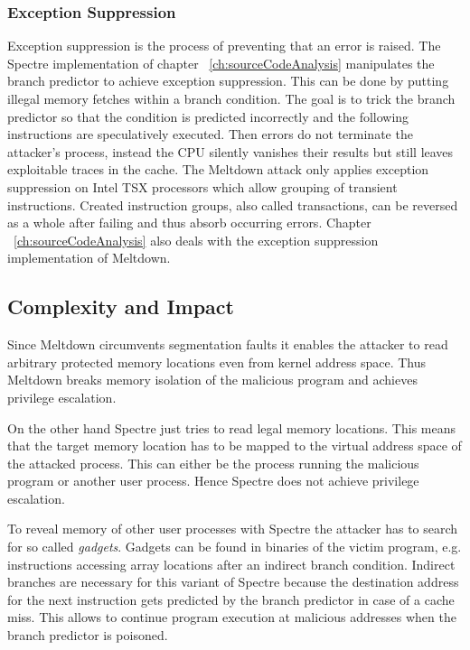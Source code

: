 \documentclass[a4paper,oneside,openright] {scrreprt}
\begin{document}
\subsubsection{Exception Suppression}

Exception suppression is the process of preventing that an error is raised. 
The Spectre implementation of chapter ~\ref{ch:sourceCodeAnalysis} manipulates the branch predictor to achieve exception suppression.
This can be done by putting illegal memory fetches within a branch condition. 
The goal is to trick the branch predictor so that the condition is predicted incorrectly and the following
instructions are speculatively executed.
Then errors do not terminate the attacker's process, instead the CPU silently vanishes their results
 but still leaves exploitable traces in the cache.
The Meltdown attack only applies exception suppression on Intel TSX processors which allow grouping of transient instructions.
Created instruction groups, also called transactions, can be reversed as a whole after failing and thus absorb occurring errors.
Chapter ~\ref{ch:sourceCodeAnalysis} also deals with the exception suppression implementation of Meltdown.

\subsection{Complexity and Impact}
\label{ch:intro:motivation:A}

Since Meltdown circumvents segmentation faults it enables the attacker to read arbitrary protected memory locations 
even from kernel address space.
Thus Meltdown breaks memory isolation of the malicious program and achieves privilege escalation. 

On the other hand Spectre just tries to read legal memory locations.
This means that the target memory location has to be mapped to the virtual address space of the attacked process.
This can either be the process running the malicious program or another user process.
Hence Spectre does not achieve privilege escalation.

To reveal memory of other user processes with Spectre the attacker has to search for so called \textit{gadgets}.
Gadgets can be found in binaries of the victim program, e.g. instructions accessing array locations after an indirect branch condition.
Indirect branches are necessary for this variant of Spectre because the destination address for the next instruction gets predicted 
by the branch predictor in case of a cache miss.
This allows to continue program execution at malicious addresses when the branch predictor is poisoned.
\end{document}
